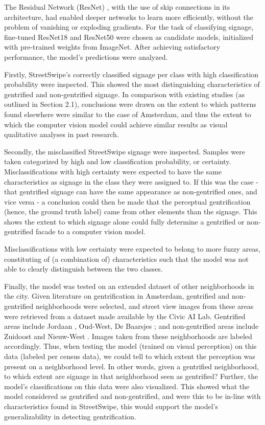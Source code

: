 The Residual Network (ResNet) \cite{resnet}, with the use of skip connections in its architecture, had enabled deeper networks to learn more efficiently, without the problem of vanishing or exploding gradients. For the task of classifying signage, fine-tuned ResNet18 and ResNet50 were chosen as candidate models, initialized with pre-trained weights from ImageNet. After achieving satisfactory performance, the model's predictions were analyzed. 

Firstly, StreetSwipe's correctly classified signage per class with high classification probability were inspected. This showed the most distinguishing characteristics of gentrified and non-gentrified signage. In comparison with existing studies (as outlined in Section 2.1), conclusions were drawn on the extent to which patterns found elsewhere were similar to the case of Amsterdam, and thus the extent to which the computer vision model could achieve similar results as visual qualitative analyses in past research.

Secondly, the misclassified StreetSwipe signage were inspected. Samples were taken categorized by high and low classification probability, or certainty. Misclassifications with high certainty were expected to have the same characteristics as signage in the class they were assigned to. If this was the case - that gentrified signage can have the same appearance as non-gentrified ones, and vice versa - a conclusion could then be made that the perceptual gentrification (hence, the ground truth label) came from other elements than the signage. This shows the extent to which signage alone could fully determine a gentrified or non-gentrified facade to a computer vision model.

Misclassifications with low certainty were expected to belong to more fuzzy areas, constituting of (a combination of) characteristics such that the model was not able to clearly distinguish between the two classes. 

Finally, the model was tested on an extended dataset of other neighborhoods in the city. Given literature on gentrification in Amsterdam, gentrified and non-gentrified neighborhoods were selected, and street view images from these areas were retrieved from a dataset made available by the Civic AI Lab. Gentrified areas include Jordaan \cite{verlaan_hippies_2022}, Oud-West, De Baarsjes \cite{rettberg_when_2019}; and non-gentrified areas include Zuidoost and Nieuw-West \cite{pinkster_stickiness_2020}. Images taken from these neighborhoods are labeled accordingly. Thus, when testing the model (trained on visual perception) on this data (labeled per census data), we could tell to which extent the perception was present on a neighborhood level. In other words, given a gentrified neighborhood, to which extent are signage in that neighborhood seen as gentrified? Further, the model's classifications on this data were also visualized. This showed what the model considered as gentrified and non-gentrified, and were this to be in-line with characteristics found in StreetSwipe, this would support the model's generalizability in detecting gentrification.

